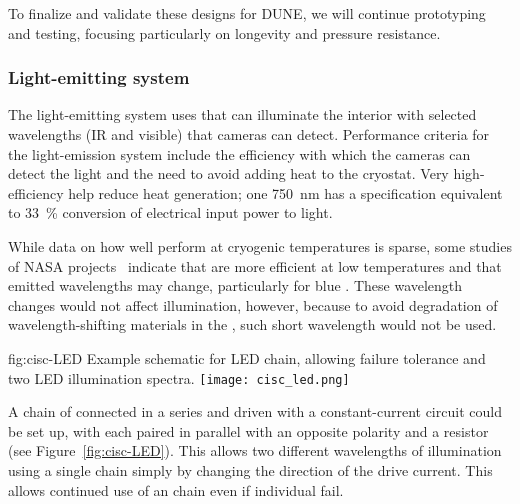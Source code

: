 To finalize and validate these designs for DUNE, we will continue prototyping and testing, focusing particularly on longevity and pressure resistance.


\subsubsection{Light-emitting system}
The light-emitting system uses  that can illuminate the interior  with selected
wavelengths (IR and visible) that cameras can detect.  Performance criteria for the light-emission system include the efficiency with which the cameras can detect the light and the need to avoid
adding heat to the cryostat. Very high-efficiency
help reduce heat generation; one \SI{750}{nm}  \cite{lumileds-DS144-pdf}
has a specification equivalent to
\SI{33}{\%} conversion of electrical input power to light.


While data on how well  perform at cryogenic temperatures is sparse,
some studies of NASA projects~\cite{Carron:2017zzz} 
indicate that  are more efficient at low temperatures
and that emitted wavelengths may change, particularly for blue .
These wavelength changes would not affect illumination, however, because
to avoid degradation of wavelength-shifting materials in the ,
such short wavelength  would not be used.

\begin{dunefigure}{fig:cisc-LED}
  {Example schematic for LED chain, allowing failure tolerance and two LED illumination spectra.}
  \texttt{[image: cisc\_led.png]}
\end{dunefigure}

A chain of  connected in a series and driven with a
constant-current circuit could be set up, with each
 paired in parallel with an opposite polarity  and a resistor
(see Figure~\ref{fig:cisc-LED}).
This allows two different wavelengths of illumination using a single chain simply by changing the direction of the drive current. This allows continued use of an  chain even if individual  fail.

